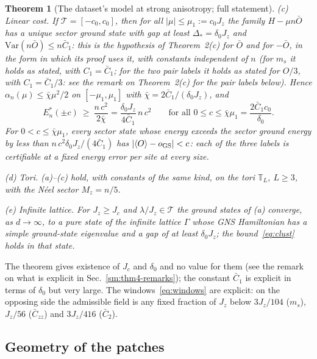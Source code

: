 \documentclass[aps,prx,onecolumn,10pt,nofootinbib,longbibliography,floatfix]{revtex4-2}
\newtheorem{theorem}{Theorem}
\theoremstyle{remark}
\newcommand{\Jz}{J_z}
\newcommand{\ms}{m_s}
\newcommand{\Czz}{\bar C_{zz}}
\newcommand{\Ctwo}{\bar C_{2}}
\begin{document}
\begin{theorem}[The dataset's model at strong anisotropy; full statement]
\emph{(c) Linear cost.} If $\mathcal T=[-c_0,c_0]$, then for all $|\mu|\le\mu_1:=c_0\Jz$ the family $H-\mu n\bar O$ has a
unique sector ground state with gap at least $\Delta_*=\delta_0\Jz$ and $\mathrm{Var}(n\bar O)\le n\bar C_1$: this is
the hypothesis of Theorem~2(c) for $\bar O$ and for $-\bar O$, in the form in which its proof uses it, with constants %
independent of $n$ (for $\ms$ it holds as stated, with $C_1=\bar C_1$; for the two pair labels it holds as stated
for $O/3$, with $C_1=\bar C_1/3$: see the remark on Theorem~2(c) for the pair labels below). Hence %
$\alpha_n(\mu)\le\bar\chi\mu^2/2$ on $[-\mu_1,\mu_1]$ with $\bar\chi=2\bar C_1/(\delta_0\Jz)$, and
\begin{equation}
E_n^*(\pm c)\ \ge\ \frac{n\,c^2}{2\bar\chi}=\frac{\delta_0\Jz}{4\bar C_1}\,n\,c^2 %
\qquad\text{for all } 0\le c\le\bar\chi\mu_1=\frac{2\bar C_1c_0}{\delta_0}. %
\label{eq:linear}
\end{equation}
For $0<c\le\bar\chi\mu_1$, every sector state whose energy exceeds the sector ground energy by less than
$n\,c^2\delta_0\Jz/(4\bar C_1)$ has $|\langle O\rangle-o_{\rm GS}|<c$: each of the three labels is certifiable at a
fixed energy error per site at every size.

\emph{(d) Tori.} (a)--(c) hold, with constants of the same kind, on the tori $\mathbb T_L$, $L\ge3$, with the N\'eel sector
$M_z=n/5$.

\emph{(e) Infinite lattice.} For $\Jz\ge J_c$ and $\lambda/\Jz\in\mathcal T$ the ground states of (a) converge, as $d\to\infty$, to a pure
state of the infinite lattice $\Gamma$ whose GNS Hamiltonian has a simple ground-state eigenvalue and a gap of at least
$\delta_0\Jz$; the bound~\eqref{eq:clust} holds in that state.
\end{theorem}

The theorem gives existence of $J_c$ and $\delta_0$ and no value for them (see the remark on what is explicit in
Sec.~\ref{sm:thm4-remarks}); the constant
$\bar C_1$ is explicit in terms of $\delta_0$ but very large. The windows~\eqref{eq:windows} are explicit: on the
opposing side the admissible field is any fixed fraction of $\Jz$ below $3\Jz/104$ ($\ms$), $\Jz/56$ %
($\Czz$) and $3\Jz/416$ ($\Ctwo$). %

\subsection{Geometry of the patches}
\end{document}
